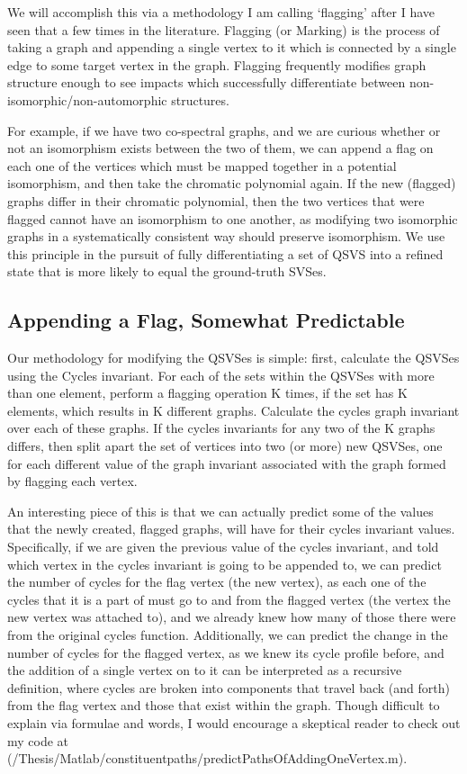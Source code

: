 We will accomplish this via a methodology I am calling `flagging' after I have seen that a few times in the literature.
Flagging (or Marking) is the process of taking a graph and appending a single vertex to it which is connected by a single edge to some target vertex in the graph.
Flagging frequently modifies graph structure enough to see impacts which successfully differentiate between non-isomorphic/non-automorphic structures.

For example, if we have two co-spectral graphs, and we are curious whether or not an isomorphism exists between the two of them, we can append a flag on each one of the vertices which must be mapped together in a potential isomorphism, and then take the chromatic polynomial again.
If the new (flagged) graphs differ in their chromatic polynomial, then the two vertices that were flagged cannot have an isomorphism to one another, as modifying two isomorphic graphs in a systematically consistent way should preserve isomorphism.
We use this principle in the pursuit of fully differentiating a set of QSVS into a refined state that is more likely to equal the ground-truth SVSes.

\subsection{Appending a Flag, Somewhat Predictable}

Our methodology for modifying the QSVSes is simple: first, calculate the QSVSes using the Cycles invariant.
For each of the sets within the QSVSes with more than one element, perform a flagging operation K times, if the set has K elements, which results in K different graphs.
Calculate the cycles graph invariant over each of these graphs.
If the cycles invariants for any two of the K graphs differs, then split apart the set of vertices into two (or more) new QSVSes, one for each different value of the graph invariant associated with the graph formed by flagging each vertex.

An interesting piece of this is that we can actually predict some of the values that the newly created, flagged graphs, will have for their cycles invariant values.
Specifically, if we are given the previous value of the cycles invariant, and told which vertex in the cycles invariant is going to be appended to, we can predict the number of cycles for the flag vertex (the new vertex), as each one of the cycles that it is a part of must go to and from the flagged vertex (the vertex the new vertex was attached to), and we already knew how many of those there were from the original cycles function.
Additionally, we can predict the change in the number of cycles for the flagged vertex, as we knew its cycle profile before, and the addition of a single vertex on to it can be interpreted as a recursive definition, where cycles are broken into components that travel back (and forth) from the flag vertex and those that exist within the graph.
Though difficult to explain via formulae and words, I would encourage a skeptical reader to check out my code at (/Thesis/Matlab/constituentpaths/predictPathsOfAddingOneVertex.m).


